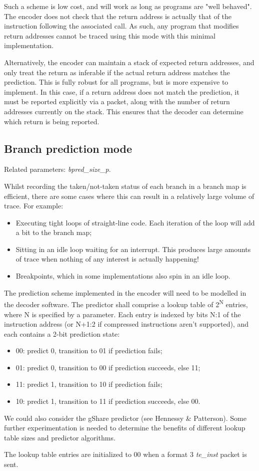 Such a scheme is low cost, and will work as long as programs are "well behaved".  The encoder does not check that the
return address is actually that of the instruction following the associated call.  As such, any program that
modifies return addresses cannot be traced using this mode with this minimal implementation.

Alternatively, the encoder can maintain a stack of expected return addresses, and only treat the 
return as inferable if the actual return address matches the prediction.  This is fully robust for all
programs, but is more expensive to implement.  In this case, if a return address does not match the prediction, 
it must be reported explicitly via a packet, along with the number of return addresses
currently on the stack.  This ensures that the decoder can determine which return is being reported. 

\subsection{Branch prediction mode} \label{sec:branch-prediction}

Related parameters: \textit{bpred\_size\_p}.

Whilst recording the taken/not-taken status of each branch in a branch map is efficient, there are 
some cases where this can result in a relatively large volume of trace.  For example:

\begin{itemize}
  \item Executing tight loops of straight-line code.  Each iteration of the loop will add a bit to the branch map;
  \item Sitting in an idle loop waiting for an interrupt.  This produces large amounts of trace when nothing of 
  any interest is actually happening!  
  \item Breakpoints, which in some implementations also spin in an idle loop.
\end{itemize}

The prediction scheme implemented in the encoder will need to be modelled in the decoder software.  
The predictor shall comprise a lookup table of 2\textsuperscript{N} entries, where N is specified by a parameter.  
Each entry is indexed by bits N:1 of the instruction address (or N+1:2 if compressed instructions aren't supported), 
and each contains a 2-bit prediction state:
\begin{itemize}
  \item 00: predict 0, transition to 01 if prediction fails;
  \item 01: predict 0, transition to 00 if prediction succeeds, else 11;
  \item 11: predict 1, transition to 10 if prediction fails;
  \item 10: predict 1, transition to 11 if prediction succeeds, else 00.
\end{itemize}

We could also consider the gShare predictor (see Hennessy \& Patterson).  Some further experimentation is needed
to determine the benefits of different lookup table sizes and predictor algorithms.

The lookup table entries are initialized to 00 when a format 3 \textit{te\_inst} packet is sent.

